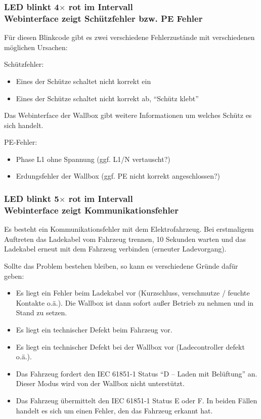 \documentclass[a4paper,10pt]{article}
\begin{document}
\begin{multicols*}{2}
    \subsubsection*{LED blinkt 4$\times$ rot im Intervall \\ Webinterface zeigt Schützfehler bzw. PE Fehler}
    Für diesen Blinkcode gibt es zwei verschiedene Fehlerzustände mit
	verschiedenen möglichen Ursachen:
	\par
	Schützfehler:
	    \begin{itemize}
        \item Eines der Schütze schaltet nicht korrekt ein
        \item Eines der Schütze schaltet nicht korrekt ab, \enquote{Schütz klebt}
    \end{itemize}
	Das Webinterface der Wallbox gibt weitere Informationen um welches Schütz es
	sich handelt.
	\par
	PE-Fehler:
    \begin{itemize}
        \item Phase L1 ohne Spannung (ggf. L1/N vertauscht?)
        \item Erdungsfehler der Wallbox (ggf. PE nicht korrekt angeschlossen?)
    \end{itemize}

    \subsubsection*{LED blinkt 5$\times$ rot im Intervall \\ Webinterface zeigt Kommunikationsfehler}
    Es besteht ein Kommunikationsfehler mit dem Elektrofahrzeug. Bei erstmaligem
    Auftreten das Ladekabel vom Fahrzeug trennen, 10 Sekunden warten und das
    Ladekabel erneut mit dem Fahrzeug verbinden (erneuter Ladevorgang).

    Sollte das Problem bestehen bleiben, so kann es verschiedene Gründe dafür
    geben:
    \begin{itemize}
        \item Es liegt ein Fehler beim Ladekabel vor (Kurzschluss, verschmutze / feuchte
              Kontakte o.ä.). Die Wallbox ist dann sofort außer Betrieb zu nehmen und
              in Stand zu setzen.
        \item Es liegt ein technischer Defekt beim Fahrzeug vor.
        \item Es liegt ein technischer Defekt bei der Wallbox vor
			(Ladecontroller defekt o.ä.).
        \item Das Fahrzeug fordert den IEC 61851-1 Status \enquote{D – Laden mit Belüftung}
              an. Dieser Modus wird von der Wallbox nicht unterstützt.
        \item Das Fahrzeug übermittelt den IEC 61851-1 Status E oder F. In beiden Fällen
              handelt es sich um einen Fehler, den das Fahrzeug erkannt hat.
    \end{itemize}


\end{multicols*}
\end{document}
